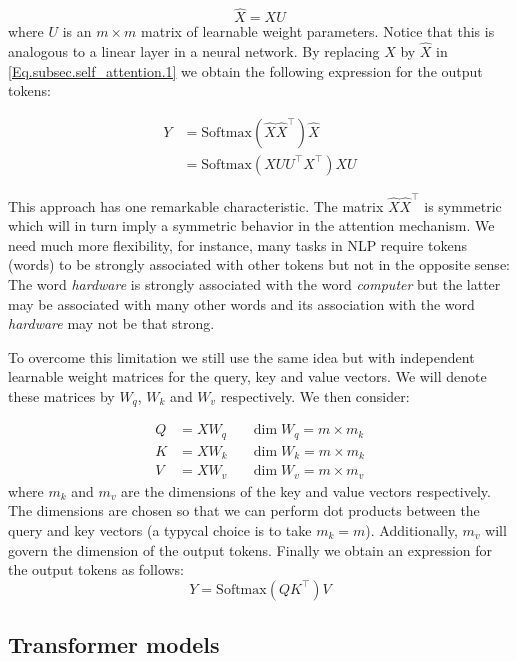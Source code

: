     \[ \widehat{X} = X U \]
    where $U$ is an $m \times m$ matrix of learnable weight parameters. Notice that this is analogous to a linear layer in a neural network. By replacing $X$ by $\widehat{X}$ in \eqref{Eq.subsec.self_attention.1} we obtain the following expression for the output tokens:

    \begin{align}\label{Eq.subsec.self_attention.2}
        Y &= \textrm{Softmax}(\widehat{X} \widehat{X}^\top) \widehat{X} \nonumber \\
        &= \textrm{Softmax}(X U U^\top X^\top) X U 
    \end{align}

    \begin{remark}
        This approach has one remarkable characteristic. The matrix $\widehat{X}\widehat{X}^\top$ is symmetric which will in turn imply a symmetric behavior in the attention mechanism. We need much more flexibility, for instance, many tasks in NLP require tokens (words) to be strongly associated with other tokens but not in the opposite sense: The word \textit{hardware} is strongly associated with the word \textit{computer} but the latter may be associated with many other words and its association with the word \textit{hardware} may not be that strong. 
    \end{remark}

    To overcome this limitation we still use the same idea but with independent learnable weight matrices for the query, key and value vectors. We will denote these matrices by $W_q$, $W_k$ and $W_v$ respectively. We then consider: 

    \begin{align*}
        Q &= X W_q  &&\dim W_q = m\times m_k \\ 
        K &= X W_k  &&\dim W_k = m\times m_k \\
        V &= X W_v &&\dim W_v = m\times m_v
    \end{align*}
    where $m_k$ and $m_v$ are the dimensions of the key and value vectors respectively. The dimensions are chosen so that we can perform dot products between the query and key vectors (a typycal choice is to take $m_k= m$). Additionally, $m_v$ will govern the dimension of the output tokens. Finally we obtain an expression for the output tokens as follows:
    \begin{equation}\label{Eq.subsec.self_attention.3}
        Y = \textrm{Softmax}(Q K^\top) V 
    \end{equation}
    
    \subsection{Transformer models}\label{subsec:transformer_models}